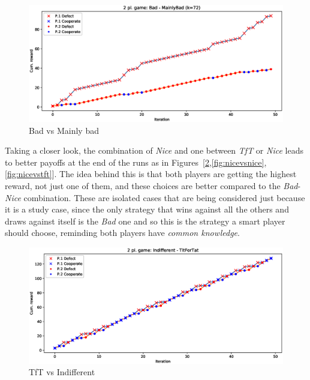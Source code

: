 \documentclass[journal,a4paper,10pt,twoside]{IEEEtran} %
\begin{document}
\begin{figure}[!ht]
    \centering
    \includegraphics[width=1\columnwidth]{../img/ipd2p/ipd2p-rewards-Bad-MainlyBad(k=72)}
    \caption{Bad vs Mainly bad}
    \label{fig:badvsmainlybad}
\end{figure}

Taking a closer look, the combination of \textit{Nice} and one between \textit{TfT} or \textit{Nice} leads to better payoffs at the end of the runs as in Figures~[\ref{fig:tftvsindiff},\ref{fig:nicevsnice},\ref{fig:nicevstft}]. The idea behind this is that both players are getting the highest reward, not just one of them, and these choices are better compared to the \textit{Bad}-\textit{Nice} combination.
These are isolated cases that are being considered just because it is a study case, since the only strategy that wins against all the others and draws against itself is the \textit{Bad} one and so this is the strategy a smart player should choose, reminding both players have \textit{common knowledge}.

\begin{figure}[!ht]
    \centering
    \includegraphics[width=1\columnwidth]{../img/ipd2p/ipd2p-rewards-Indifferent-TitForTat}
    \caption{TfT vs Indifferent}
    \label{fig:tftvsindiff}
\end{figure}
\end{document}

